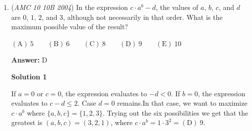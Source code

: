 \begin{enumerate}
 We can not guarantee that the product will be divisible by $5$, as the number $5$ can end on the bottom.

 We can guarantee that the product will be divisible by $3$ (one of $3$ and $6$ will always be visible), but not by $3^2$.

 Finally, there are three even numbers, hence two of them are always visible and thus the product is divisible by $2^2$. This is the most we can guarantee, as when the $4$ is on the bottom side, the two visible even numbers are $2$ and $6$, and their product is not divisible by $2^3$.

 



\textbf{Solution 3}

The product P can be one of the following six numbers excluding the number that is hidden under, so we have:\begin{align*}2 \cdot 3 \cdot 4 \cdot 5 \cdot 6 = 2^4 \cdot 3^2 \cdot 5 \\1 \cdot 3 \cdot 4 \cdot 5 \cdot 6 = 2^3 \cdot 3^2 \cdot 5 \\1 \cdot 2 \cdot 4 \cdot 5 \cdot 6 = 2^4 \cdot 3 \cdot 5 \\1 \cdot 2 \cdot 3 \cdot 5 \cdot 6 = 2^2 \cdot 3^2 \cdot 5 \\1 \cdot 2 \cdot 3 \cdot 4 \cdot 6 = 2^4 \cdot 3^2 \\1 \cdot 2 \cdot 3 \cdot 4 \cdot 5 = 2^3 \cdot 3 \cdot 5\end{align*}


 The largest number that is certain to divide product P is basically GCD of all the above 6 products which is $2^2 \cdot 3$.

 Hence $P=3\cdot2^2=\boxed{\mathrm{(B)}\ 12}$.

 


	\item (\textit{AMC 10 10B 2004}) In the expression $c\cdot a^b-d$, the values of $a$, $b$, $c$, and $d$ are $0$, $1$, $2$, and $3$, although not necessarily in that order. What is the maximum possible value of the result?


 $\mathrm{(A) \ } 5 \qquad \mathrm{(B) \ } 6\qquad \mathrm{(C) \ } 8 \qquad \mathrm{(D) \ } 9\qquad \mathrm{(E) \ } 10$

 \textbf{Answer: }D



\textbf{Solution 1}

If $a=0$ or $c=0$, the expression evaluates to $-d<0$. 
If $b=0$, the expression evaluates to $c-d\leq 2$. 
Case $d=0$ remains.In that case, we want to maximize $c\cdot a^b$ where $\{a,b,c\}=\{1,2,3\}$. Trying out the six possibilities we get that the greatest is $(a,b,c)=(3,2,1)$, where $c\cdot a^b=1\cdot 3^2=\boxed{\mathrm{(D)}\ 9}$.


\end{enumerate}
